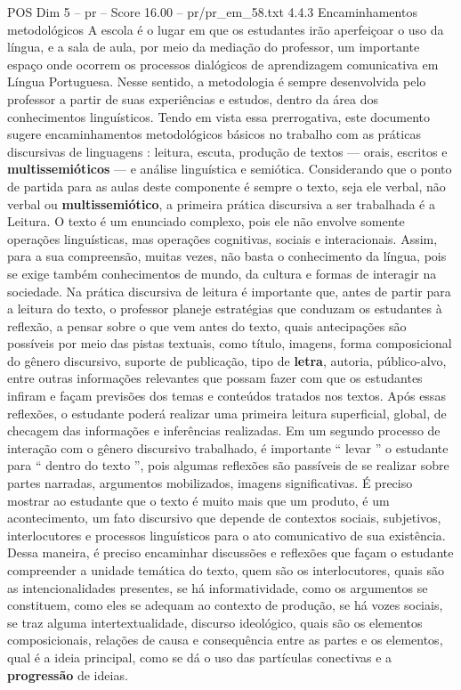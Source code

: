 \begin{textsample}{POS Dim 5 – pr – Score 16.00 – pr/pr\_em\_58.txt}  \label{ex:f5_pos_051}
4.4.3 Encaminhamentos metodológicos A escola é o lugar em que os estudantes irão aperfeiçoar o uso da língua, e a sala de aula, por meio da mediação do professor, um importante espaço onde ocorrem os processos dialógicos de aprendizagem comunicativa em Língua Portuguesa.
Nesse sentido, a metodologia é sempre desenvolvida pelo professor a partir de suas experiências e estudos, dentro da área dos conhecimentos linguísticos.
Tendo em vista essa prerrogativa, este documento sugere encaminhamentos metodológicos básicos no trabalho com as práticas discursivas de linguagens : leitura, escuta, produção de textos — orais, escritos e \textbf{multissemióticos} — e análise linguística e semiótica.
Considerando que o ponto de partida para as aulas deste componente é sempre o texto, seja ele verbal, não verbal ou \textbf{multissemiótico}, a primeira prática discursiva a ser trabalhada é a Leitura.
O texto é um enunciado complexo, pois ele não envolve somente operações linguísticas, mas operações cognitivas, sociais e interacionais.
Assim, para a sua compreensão, muitas vezes, não basta o conhecimento da língua, pois se exige também conhecimentos de mundo, da cultura e formas de interagir na sociedade.
Na prática discursiva de leitura é importante que, antes de partir para a leitura do texto, o professor planeje estratégias que conduzam os estudantes à reflexão, a pensar sobre o que vem antes do texto, quais antecipações são possíveis por meio das pistas textuais, como título, imagens, forma composicional do gênero discursivo, suporte de publicação, tipo de \textbf{letra}, autoria, público-alvo, entre outras informações relevantes que possam fazer com que os estudantes infiram e façam previsões dos temas e conteúdos tratados nos textos.
Após essas reflexões, o estudante poderá realizar uma primeira leitura superficial, global, de checagem das informações e inferências realizadas.
Em um segundo processo de interação com o gênero discursivo trabalhado, é importante “ levar ” o estudante para “ dentro do texto ”, pois algumas reflexões são passíveis de se realizar sobre partes narradas, argumentos mobilizados, imagens significativas.
É preciso mostrar ao estudante que o texto é muito mais que um produto, é um acontecimento, um fato discursivo que depende de contextos sociais, subjetivos, interlocutores e processos linguísticos para o ato comunicativo de sua existência.
Dessa maneira, é preciso encaminhar discussões e reflexões que façam o estudante compreender a unidade temática do texto, quem são os interlocutores, quais são as intencionalidades presentes, se há informatividade, como os argumentos se constituem, como eles se adequam ao contexto de produção, se há vozes sociais, se traz alguma intertextualidade, discurso ideológico, quais são os elementos composicionais, relações de causa e consequência entre as partes e os elementos, qual é a ideia principal, como se dá o uso das partículas conectivas e a \textbf{progressão} de ideias.

\end{textsample}
